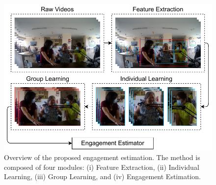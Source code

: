 \documentclass[twocolumn]{svjour3}
\begin{document}
\begin{figure}[t]
  \centering
  \includegraphics[width=\linewidth]{assets/architecture.drawio}
  \caption{Overview of the proposed engagement estimation. The method is composed of four modules: (i) Feature Extraction, (ii) Individual Learning, (iii) Group Learning, and (iv) Engagement Estimation.}
  \label{f:architecture}
\end{figure}
\end{document}
